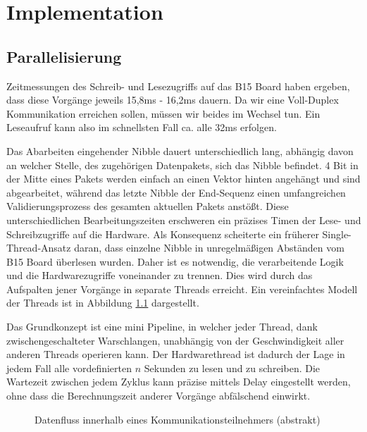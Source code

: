 \chapter{Implementation}
\section{Parallelisierung}
Zeitmessungen des Schreib- und Lesezugriffs auf das B15 Board haben ergeben, dass diese Vorgänge jeweils 15,8ms - 16,2ms dauern. Da wir eine Voll-Duplex Kommunikation erreichen sollen, müssen wir beides im Wechsel tun. Ein Leseaufruf kann also im schnellsten Fall ca. alle 32ms erfolgen.

Das Abarbeiten eingehender Nibble dauert unterschiedlich lang, abhängig davon an welcher Stelle, des zugehörigen Datenpakets, sich das Nibble befindet. 4 Bit in der Mitte eines Pakets werden einfach an einen Vektor hinten angehängt und sind abgearbeitet, während das letzte Nibble der End-Sequenz einen umfangreichen Validierungsprozess des gesamten aktuellen Pakets anstößt. Diese unterschiedlichen Bearbeitungszeiten erschweren ein präzises Timen der Lese- und Schreibzugriffe auf die Hardware. Als Konsequenz scheiterte ein früherer Single-Thread-Ansatz daran, dass einzelne Nibble in unregelmäßigen Abständen vom B15 Board überlesen wurden. Daher ist es notwendig, die verarbeitende Logik und die Hardwarezugriffe voneinander zu trennen. Dies wird durch das Aufspalten jener Vorgänge in separate Threads erreicht. Ein vereinfachtes Modell der Threads ist in Abbildung \ref{fig:datenfluss} dargestellt.

Das Grundkonzept ist eine mini Pipeline, in welcher jeder Thread, dank zwischengeschalteter Warschlangen, unabhängig von der Geschwindigkeit aller anderen Threads operieren kann. Der Hardwarethread ist dadurch der Lage in jedem Fall alle vordefinierten $n$ Sekunden zu lesen und zu schreiben. Die Wartezeit zwischen jedem Zyklus kann präzise mittels Delay eingestellt werden, ohne dass die Berechnungszeit anderer Vorgänge abfälschend einwirkt.

\begin{figure}[H]
    \centering
    \begin{adjustbox}{scale=0.6}
        
    \end{adjustbox}
    \caption{Datenfluss innerhalb eines Kommunikationsteilnehmers (abstrakt)}
    \label{fig:datenfluss}
\end{figure}

